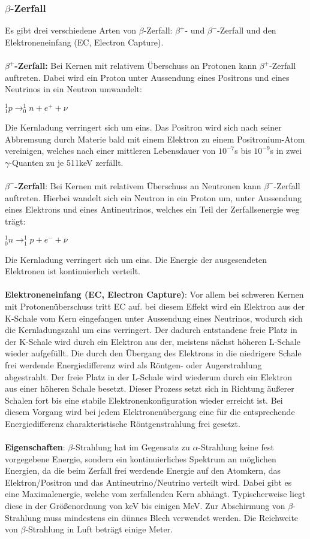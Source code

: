 \subsubsection{$\beta$-Zerfall}
Es gibt drei verschiedene Arten von $\beta$-Zerfall: $\beta^+$- und $\beta^-$-Zerfall und den Elektroneneinfang (EC, Electron Capture).\\
~\\
\textbf{$\beta^+$-Zerfall:} Bei Kernen mit relativem Überschuss an Protonen kann $\beta^+$-Zerfall auftreten. Dabei wird ein Proton unter Aussendung eines Positrons und eines Neutrinos in ein Neutron umwandelt:
\begin{center}
$\mathit{_1^1p \rightarrow _0^1n + e^+ + \nu}$
\end{center}
Die Kernladung verringert sich um eins. Das Positron wird sich nach seiner Abbremsung durch Materie bald mit einem Elektron zu einem Positronium-Atom vereinigen, welches nach einer mittleren Lebensdauer von $10^{-7}$s bis $10^{-9}$s in zwei $\gamma$-Quanten zu je 511keV zerfällt.\\
~\\
\textbf{$\beta^-$-Zerfall}: Bei Kernen mit relativem Überschuss an Neutronen kann $\beta^-$-Zerfall auftreten. Hierbei wandelt sich ein Neutron in ein Proton um, unter Aussendung eines Elektrons und eines Antineutrinos, welches ein Teil der Zerfallsenergie weg trägt:
\begin{center}
$\mathit{_0^1n \rightarrow _1^1p+e^- + \overline{\nu}}$
\end{center}
Die Kernladung verringert sich um eins. Die Energie der ausgesendeten Elektronen ist kontinuierlich verteilt.\\
~\\
\textbf{Elektroneneinfang (EC, Electron Capture)}: Vor allem bei schweren Kernen mit Protonenüberschuss tritt EC auf. bei diesem Effekt wird ein Elektron aus der K-Schale vom Kern eingefangen unter Aussendung eines Neutrinos, wodurch sich die Kernladungszahl um eins verringert. Der dadurch entstandene freie Platz in der K-Schale wird durch ein Elektron aus der, meistens nächst höheren L-Schale wieder aufgefüllt. Die durch den Übergang des Elektrons in die niedrigere Schale frei werdende Energiedifferenz wird als Röntgen- oder Augerstrahlung abgestrahlt. Der freie Platz in der L-Schale wird wiederum durch ein Elektron aus einer höheren Schale besetzt. Dieser Prozess setzt sich in Richtung äußerer Schalen fort bis eine stabile Elektronenkonfiguration wieder erreicht ist. Bei diesem Vorgang wird bei jedem Elektronenübergang eine für die entsprechende Energiedifferenz charakteristische Röntgenstrahlung frei gesetzt.\\
~\\
\textbf{Eigenschaften}: $\beta$-Strahlung hat im Gegensatz zu $\alpha$-Strahlung keine fest vorgegebene Energie, sondern ein kontinuierliches Spektrum an möglichen Energien, da die beim Zerfall frei werdende Energie auf den Atomkern, das Elektron/Positron und das Antineutrino/Neutrino verteilt wird. Dabei gibt es eine Maximalenergie, welche vom zerfallenden Kern abhängt. Typischerweise liegt diese in der Größenordnung von keV bis einigen MeV. Zur Abschirmung von $\beta$-Strahlung muss mindestens ein dünnes Blech verwendet werden. Die Reichweite von $\beta$-Strahlung in Luft beträgt einige Meter.
